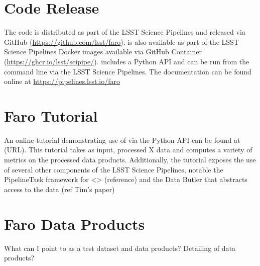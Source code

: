 \section{Code Release}
The \faro code is distributed as part of the LSST Science Pipelines and released via GitHub (\url{https://github.com/lsst/faro}).
\faro is also available as part of the LSST Science Pipelines Docker images available via GitHub Container (\url{https://ghcr.io/lsst/scipipe/}).
\faro includes a Python API and can be run from the command line via the LSST Science Pipelines.
The documentation can be found online at \url{https://pipelines.lsst.io/faro}

\section{Faro Tutorial}
An online tutorial demonstrating use of \faro via the Python API can be found at (URL).
This tutorial takes as input, processed X data and computes a variety of metrics on the processed data products.
Additionally, the tutorial exposes the use of several other components of the LSST Science Pipelines, notable the PipelineTask framework for <> (reference) and the Data Butler that abstracts access to the data  (ref Tim's paper)

\section{Faro Data Products}
What can I point to as a test dataset and data products?
Detailing of data products?

